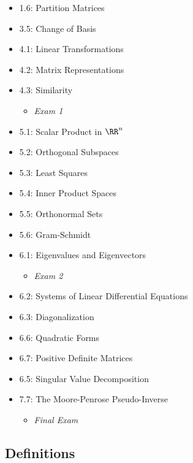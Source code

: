 \begin{itemize}
\tightlist
\item
  1.6: Partition Matrices
\item
  3.5: Change of Basis
\item
  4.1: Linear Transformations
\item
  4.2: Matrix Representations
\item
  4.3: Similarity

  \begin{itemize}
  \tightlist
  \item
    \emph{Exam 1}\\
  \end{itemize}
\item
  5.1: Scalar Product in \(\RR^n\)
\item
  5.2: Orthogonal Subspaces
\item
  5.3: Least Squares
\item
  5.4: Inner Product Spaces
\item
  5.5: Orthonormal Sets
\item
  5.6: Gram-Schmidt
\item
  6.1: Eigenvalues and Eigenvectors

  \begin{itemize}
  \tightlist
  \item
    \emph{Exam 2}
  \end{itemize}
\item
  6.2: Systems of Linear Differential Equations
\item
  6.3: Diagonalization
\item
  6.6: Quadratic Forms
\item
  6.7: Positive Definite Matrices
\item
  6.5: Singular Value Decomposition
\item
  7.7: The Moore-Penrose Pseudo-Inverse

  \begin{itemize}
  \tightlist
  \item
    \emph{Final Exam}
  \end{itemize}
\end{itemize}

\hypertarget{definitions}{%
\subsection{Definitions}\label{definitions}}

